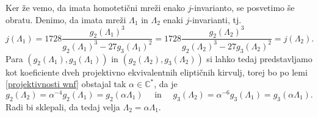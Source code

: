 \documentclass[mat1]{fmfdelo}
\numberwithin{equation}{section}
\newcommand{\HH}{\mathfrak{H}}
\newcommand{\CM}{\mathbb C ^*}
\newcommand{\htp}{\simeq}
\newcommand{\lattice}[2]{\left\langle #1, #2 \right\rangle}
\newcommand{\tj}{tj.\ }
\theoremstyle{definition}
\begin{document}
\begin{dokaz}
    Ker že vemo, da imata homotetični mreži enako $j$-invarianto, se posvetimo še obratu. Denimo, da imata mreži $\Lambda_1$ in $\Lambda_2$ enaki $j$-invarianti, \tj
    \[
        j(\Lambda_1) = 
        1728\frac{g_2(\Lambda_1)^3}{g_2(\Lambda_1)^3 - 27g_3(\Lambda_1)^2} =
        1728\frac{g_2(\Lambda_2)^3}{g_2(\Lambda_2)^3 - 27g_3(\Lambda_2)^2} = 
        j(\Lambda_2).
    \]
    Para $(g_2(\Lambda_1), g_3(\Lambda_1))$ in $(g_2(\Lambda_2), g_3(\Lambda_2))$ si lahko tedaj predstavljamo kot koeficiente dveh projektivno ekvivalentnih eliptičnih kirvulj, torej bo po lemi \ref{projektivnosti wnf} obstajal tak $\alpha \in \CM$, da je 
    \[
        g_2(\Lambda_2) = \alpha^{-4}g_2(\Lambda_1) = g_2(\alpha\Lambda_1) 
        \quad \text{ in } \quad
        g_3(\Lambda_2) = \alpha^{-6}g_3(\Lambda_1) = g_3(\alpha\Lambda_1). 
    \]
    Radi bi sklepali, da tedaj velja $\Lambda_2 = \alpha\Lambda_1$. 


\end{dokaz}
\end{document}
